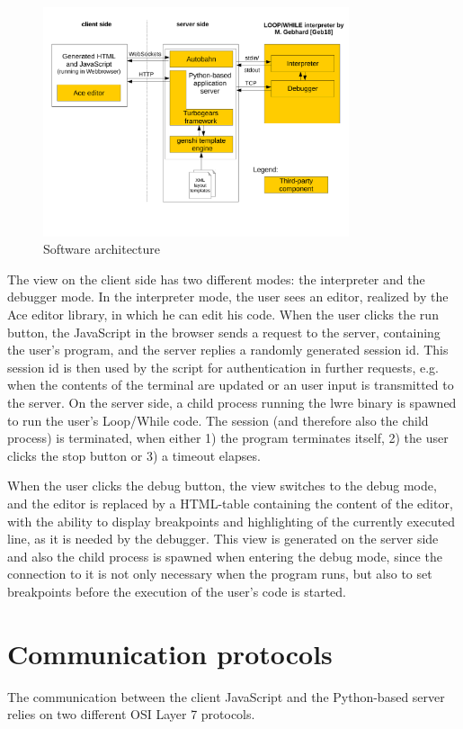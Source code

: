 \begin{figure}[H]
    \centering
    \includegraphics[width=340px]{img/Architecture.pdf}
    \caption[Software architecture]{Software architecture}
    \label{fig:software_arch}
\end{figure}

The view on the client side has two different modes: the interpreter and the debugger mode.
In the interpreter mode, the user sees an editor, realized
by the Ace editor library, in which he can edit his code. When the user clicks the run button, the JavaScript in the browser sends a
request to the server, containing the user's program, and the server replies a randomly generated session id. This session id is then
used by the script for authentication in further requests, e.g. when the contents of the terminal are updated or an user input is transmitted
to the server. On the server side, a child process running the lwre binary is spawned to run the user's Loop/While code. The session (and therefore 
also the child process) is terminated, when either 1) the program terminates itself, 2) the user clicks the stop button or 3) a timeout elapses.

When the user clicks the debug button, the view switches to the debug mode, and the editor is replaced by a HTML-table containing the content of
the editor, with the ability to display breakpoints and highlighting of the currently executed line, as it is needed by the debugger. This view is
generated on the server side and also the child process is spawned when entering the debug mode, since the connection to it is not only necessary
when the program runs, but also to set breakpoints before the execution of the user's code is started.

\section{Communication protocols}
The communication between the client JavaScript and the Python-based server relies on two different OSI Layer 7 protocols.

